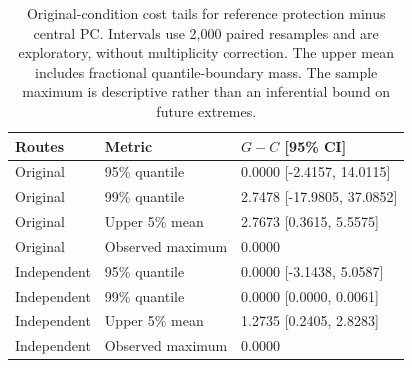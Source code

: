 \begin{table}[t]
\centering
\caption{Original-condition cost tails for reference protection minus central PC. Intervals use 2,000 paired resamples and are exploratory, without multiplicity correction. The upper mean includes fractional quantile-boundary mass. The sample maximum is descriptive rather than an inferential bound on future extremes.}
\label{tab:guarded-tails}
\footnotesize\setlength{\tabcolsep}{3pt}\renewcommand{\arraystretch}{1.12}
\begin{tabular}{@{}lp{}p{}@{}}
\toprule
Routes & Metric & $G-C$ [95\% CI] \\
\midrule
Original & 95\% quantile & 0.0000 [-2.4157, 14.0115] \\
Original & 99\% quantile & 2.7478 [-17.9805, 37.0852] \\
Original & Upper 5\% mean & 2.7673 [0.3615, 5.5575] \\
Original & Observed maximum & 0.0000 \\
Independent & 95\% quantile & 0.0000 [-3.1438, 5.0587] \\
Independent & 99\% quantile & 0.0000 [0.0000, 0.0061] \\
Independent & Upper 5\% mean & 1.2735 [0.2405, 2.8283] \\
Independent & Observed maximum & 0.0000 \\
\bottomrule
\end{tabular}
\end{table}
